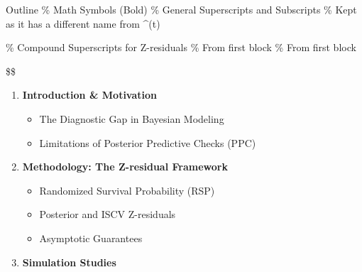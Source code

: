 \documentclass[
  ignorenonframetext,
]{beamer}
\providecommand{\tightlist}{%
  \setlength{\itemsep}{0pt}\setlength{\parskip}{0pt}}
\begin{document}
\begin{frame}{Outline}
\% Math Symbols (Bold) \newcommand{\btheta}[0]{\bm{\theta}}
\newcommand{\bTheta}[0]{\bm{\Theta}} \newcommand{\bx}[0]{\bm{x}}
\newcommand{\by}[0]{\bm{y}} \newcommand{\bY}[0]{\bm{Y}}
\newcommand{\bbeta}{\bm{\beta}} \newcommand{\bBeta}{\bm{\Beta}}
\newcommand{\blambda}{\bm{\lambda}} \newcommand{\bmu}{\bm{\mu}}
\newcommand{\bphi}{\bm{\phi}} \newcommand{\bp}{\bm{p}}
\newcommand{\bsgm}{\bm{\sigma}} \newcommand{\hu}[0]{\pi^o_{i}}
\newcommand{\mhu}[0]{\pi^o} \% General Superscripts and Subscripts
\newcommand{\obs}[0]{^{\text{obs}}} \newcommand{\sobs}[0]{^{\text{obs}}}
\newcommand{\post}[0]{^{\text{Post}}} \newcommand{\cv}[0]{^{\text{CV}}}
\newcommand{\iscv}[0]{^{\text{ISCV}}} \newcommand{\supt}[0]{^{(t)}}
\newcommand{\mci}{^{(t)}} \% Kept as it has a different name from ^{(t)}
\newcommand{\mcs}{^{(s)}} \newcommand{\rep}{^{\text{rep}}}
\newcommand{\ppc}{_{\text{ppc}}} \newcommand{\noi}{_{-i}}
\newcommand{\wi}{_{1:n}} \newcommand{\IS}{^{\text{\scriptsize IS}}}

\% Compound Superscripts for Z-residuals
\newcommand{\rspp}[0]{^{\text{Post-RSP}}}
\newcommand{\mspp}[0]{^{\text{Post-MSP}}}
\newcommand{\rspis}[0]{^{\text{ISCV-RSP}}}
\newcommand{\mspis}[0]{^{\text{ISCV-MSP}}}
\newcommand{\rsppost}{^{\text{Post-RSP }}} \% From first block
\newcommand{\rspiscv}{^{\text{ISCV-RSP}}} \% From first block
\newcommand{\E}{\mathbb{E}}
\newcommand{\Epost}{\mathbb{E}_{\btheta\,|\,\by}}
\newcommand{\Ecv}{\mathbb{E}_{\btheta\,|\,\by_{-i}}}
\newcommand{\highlight}[1]{\textcolor{blue}{#1}}
\newcommand{\pvalue}[0]{$p$-value\xspace}
\newcommand{\pvalues}[0]{$p$-values\xspace}
\newcommand{\norm}[1]{\left\lVert#1\right\rVert}

\newcommand{\textred}[1]{\textcolor{orange}{#1}}

\$\$

\begin{enumerate}
\item
  \textbf{Introduction \& Motivation}

  \begin{itemize}
  \tightlist
  \item
    The Diagnostic Gap in Bayesian Modeling
  \item
    Limitations of Posterior Predictive Checks (PPC)
  \end{itemize}
\item
  \textbf{Methodology: The Z-residual Framework}

  \begin{itemize}
  \tightlist
  \item
    Randomized Survival Probability (RSP)
  \item
    Posterior and ISCV Z-residuals
  \item
    Asymptotic Guarantees
  \end{itemize}
\item
  \textbf{Simulation Studies}


\end{enumerate}
\end{frame}
\end{document}
